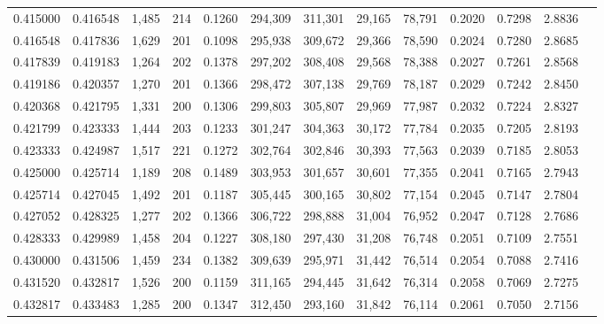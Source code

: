 \begin{tabular}{rrrrrrrrrrrrr}
0.415000 & 0.416548 &  1,485 &   214 &                                     0.1260 & 294,309 & 311,301 &  29,165 &  78,791 & 0.2020 & 0.7298 & 2.8836 \\
0.416548 & 0.417836 &  1,629 &   201 &                                     0.1098 & 295,938 & 309,672 &  29,366 &  78,590 & 0.2024 & 0.7280 & 2.8685 \\
0.417839 & 0.419183 &  1,264 &   202 &                                     0.1378 & 297,202 & 308,408 &  29,568 &  78,388 & 0.2027 & 0.7261 & 2.8568 \\
0.419186 & 0.420357 &  1,270 &   201 &                                     0.1366 & 298,472 & 307,138 &  29,769 &  78,187 & 0.2029 & 0.7242 & 2.8450 \\
0.420368 & 0.421795 &  1,331 &   200 &                                     0.1306 & 299,803 & 305,807 &  29,969 &  77,987 & 0.2032 & 0.7224 & 2.8327 \\
0.421799 & 0.423333 &  1,444 &   203 &                                     0.1233 & 301,247 & 304,363 &  30,172 &  77,784 & 0.2035 & 0.7205 & 2.8193 \\
0.423333 & 0.424987 &  1,517 &   221 &                                     0.1272 & 302,764 & 302,846 &  30,393 &  77,563 & 0.2039 & 0.7185 & 2.8053 \\
0.425000 & 0.425714 &  1,189 &   208 &                                     0.1489 & 303,953 & 301,657 &  30,601 &  77,355 & 0.2041 & 0.7165 & 2.7943 \\
0.425714 & 0.427045 &  1,492 &   201 &                                     0.1187 & 305,445 & 300,165 &  30,802 &  77,154 & 0.2045 & 0.7147 & 2.7804 \\
0.427052 & 0.428325 &  1,277 &   202 &                                     0.1366 & 306,722 & 298,888 &  31,004 &  76,952 & 0.2047 & 0.7128 & 2.7686 \\
0.428333 & 0.429989 &  1,458 &   204 &                                     0.1227 & 308,180 & 297,430 &  31,208 &  76,748 & 0.2051 & 0.7109 & 2.7551 \\
0.430000 & 0.431506 &  1,459 &   234 &                                     0.1382 & 309,639 & 295,971 &  31,442 &  76,514 & 0.2054 & 0.7088 & 2.7416 \\
0.431520 & 0.432817 &  1,526 &   200 &                                     0.1159 & 311,165 & 294,445 &  31,642 &  76,314 & 0.2058 & 0.7069 & 2.7275 \\
0.432817 & 0.433483 &  1,285 &   200 &                                     0.1347 & 312,450 & 293,160 &  31,842 &  76,114 & 0.2061 & 0.7050 & 2.7156 \\

\end{tabular}
